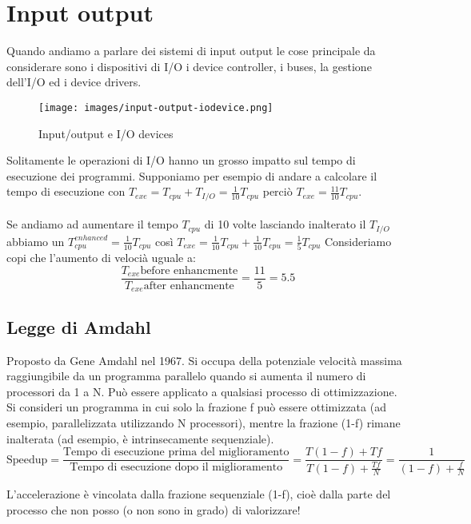 \newpage
\section{Input output}
Quando andiamo a parlare dei sistemi di input output le cose principale da considerare sono i 
dispositivi di I/O i device controller, i buses, la gestione dell'I/O ed i device drivers.

\begin{figure}[!h]
    \centering
    \texttt{[image: images/input-output-iodevice.png]}
    \caption{Input/output e I/O devices}
\end{figure}

\hspace{-15pt}Solitamente le operazioni di I/O hanno un grosso impatto sul tempo di esecuzione dei programmi.
Supponiamo per esempio di andare a calcolare il tempo di esecuzione con \(T_{exe} = T_{cpu} + T_{I/O} = \frac{1}{10}T_{cpu}\) perciò
\(T_{exe} = \frac{11}{10}T_{cpu}\).\\\\
\hspace{-15pt}Se andiamo ad aumentare il tempo \(T_{cpu}\) di 10 volte lasciando inalterato il \(T_{I/O}\) abbiamo
un \(T_{cpu}^{enhanced} = \frac{1}{10} T_{cpu}\) così \(T_{exe} = \frac{1}{10}T_{cpu} + \frac{1}{10}T_{cpu} = \frac{1}{5}T_{cpu}\)
Consideriamo copi che l'aumento di velocià uguale a: \[\frac{T_{exe} \text{before enhancmente}}{T_{exe} \text{after enhancmente}} = \frac{11}{5} = 5.5\]

\subsection{Legge di Amdahl}
Proposto da Gene Amdahl nel 1967. Si occupa della potenziale velocità massima raggiungibile da un programma parallelo quando si aumenta il numero di processori da 1 a N.
Può essere applicato a qualsiasi processo di ottimizzazione. 
Si consideri un programma in cui solo la frazione f può essere ottimizzata (ad esempio, parallelizzata utilizzando N processori), mentre la frazione (1-f) rimane inalterata (ad esempio, è intrinsecamente sequenziale).
\[\text{Speedup} = \frac{\text{Tempo di esecuzione prima del miglioramento}}{\text{Tempo di esecuzione dopo il miglioramento}} = \frac{T(1- f) + Tf}{T(1 - f) + \frac{Tf}{N}} = \frac{1}{(1 - f) + \frac{f}{N}}\]

\begin{observation}
    L'accelerazione è vincolata dalla frazione sequenziale (1-f), cioè dalla parte del processo che non posso (o non sono in grado) di valorizzare!
\end{observation}

